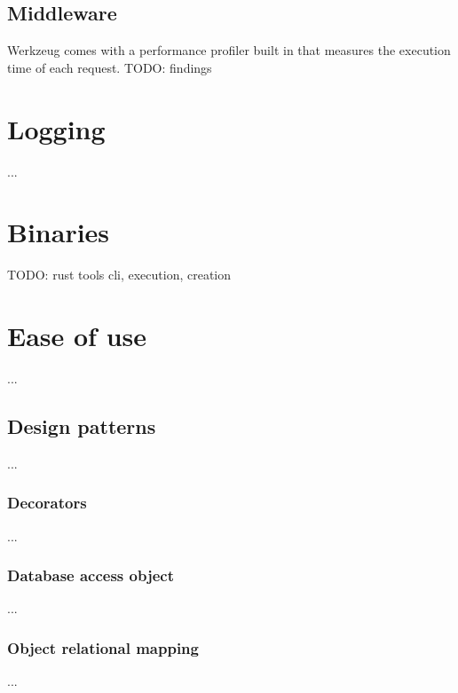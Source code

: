     \subsection{Middleware}
    Werkzeug comes with a performance profiler built in that measures the execution time of each request. TODO: findings
    \section{Logging}
    ...
    \section{Binaries}
    TODO: rust tools cli, execution, creation
    
    \section{Ease of use}
    ...
    \subsection{Design patterns}
    ...
    \subsubsection{Decorators}
    ...
    \subsubsection{Database access object}
    ...
    \subsubsection{Object relational mapping}
    ...